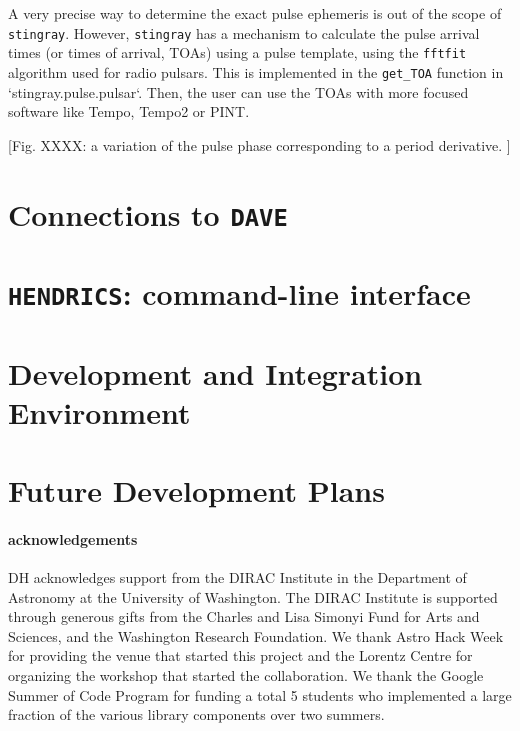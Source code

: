 \documentclass[12pt]{emulateapj}
\newcommand{\stingray}{\texttt{stingray}\xspace}
\newcommand{\hendrics}{\texttt{HENDRICS}\xspace}
\begin{document}
A very precise way to determine the exact pulse ephemeris is out of the scope of \stingray. 
However, \stingray has a mechanism to calculate the pulse arrival times (or times of arrival, TOAs) using a pulse template, using the \texttt{fftfit} algorithm used for radio pulsars. 
This is implemented in the \texttt{get\_TOA} function in `stingray.pulse.pulsar`.
Then, the user can use the TOAs with more focused software like Tempo, Tempo2 or PINT.

[Fig. XXXX: a variation of the pulse phase corresponding to a period derivative. ]

\section{Connections to \texttt{DAVE}}
\label{sec:dave}

\section{\hendrics: command-line interface}
\label{sec:hendrics}


\section{Development and Integration Environment}
\label{sec:development}

\section{Future Development Plans}
\label{sec:future}

\paragraph{acknowledgements}
DH acknowledges support from the DIRAC Institute in the Department of Astronomy at the University of Washington. The DIRAC Institute is supported through generous gifts from the Charles and Lisa Simonyi Fund for Arts and Sciences, and the Washington Research Foundation.
We thank Astro Hack Week for providing the venue that started this project and the Lorentz Centre for organizing the workshop that started the collaboration. We thank the Google Summer of Code Program for funding a total 5 students who implemented a large fraction of the various library components over two summers.



\end{document}
